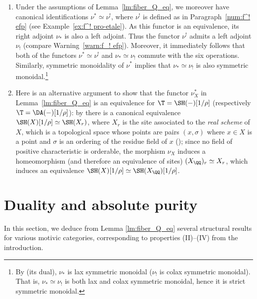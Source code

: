 \skpt
\begin{rem}\label{rem:nu^* six operations}
\begin{enumerate}
\item
Under the assumptions of Lemma~\ref{lm:fiber_Q_eq}, we moreover have canonical identifications $\nu^*\simeq\nu^!$, where $\nu^!$ is defined as in Paragraph~\ref{num:f^! efp} (see Example~\ref{ex:f^! pro-etale}).
As this functor is an equivalence, its right adjoint $\nu_*$ is also a left adjoint.
Thus the functor $\nu^!$ admits a left adjoint $\nu_!$ (compare Warning~\ref{warn:f_! efp}).
Moreover, it immediately follows that both of the functors $\nu^* \simeq \nu^!$ and $\nu_* \simeq \nu_!$ commute with the six operations.
Similarly, symmetric monoidality of $\nu^*$ implies that $\nu_*\simeq\nu_!$ is also symmetric monoidal.\footnote{By \cite[Prop.\,2.5.5.1]{LurieSAG} (\resp its dual), $\nu_*$ is lax symmetric monoidal (\resp $\nu_!$ is colax symmetric monoidal).
That is, $\nu_*\simeq\nu_!$ is both lax and colax symmetric monoidal, hence it is strict symmetric monoidal.}

\item
Here is an alternative argument to show that the functor $\nu_X^*$ in Lemma~\ref{lm:fiber_Q_eq} is an equivalence for $\T=\SH(-)[1/\rho]$ (respectively $\T=\DA(-)[1/\rho]$): by \cite[Th.\,35]{Bachmann} there is a canonical equivalence $\SH(X)[1/\rho]\simeq\SH(X_r)$, where $X_r$ is the site associated to the \emph{real scheme} of $X$, which is a topological space whose points are pairs $(x,\sigma)$ where $x\in X$ is a point and $\sigma$ is an ordering of the residue field of $x$ (\cite[0.4.1]{Scheiderer}); since no field of positive characteristic is orderable, the morphism $\nu_X$ induces a homeomorphism (and therefore an equivalence of sites) $(X_\QQ)_r\simeq X_r$, which induces an equivalence $\SH(X)[1/\rho]\simeq\SH(X_\QQ)[1/\rho]$.
\end{enumerate}
\end{rem}

\section{Duality and absolute purity}
\label{sec:abspur}

In this section, we deduce from Lemma \ref{lm:fiber_Q_eq} several structural results for various motivic categories, corresponding to properties (II)--(IV) from the introduction.

